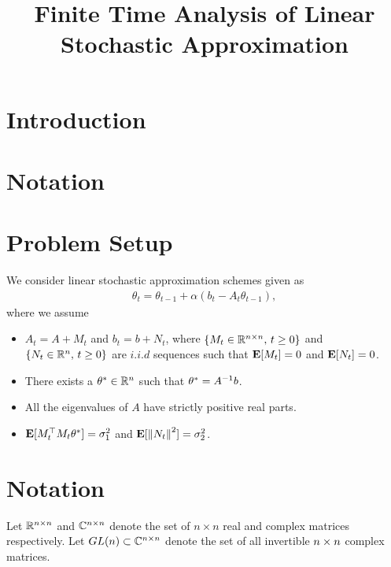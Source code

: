 \documentclass{article}
\title{Finite Time Analysis of Linear Stochastic Approximation}
\author{
}
\begin{document}

\maketitle
\begin{abstract}

\end{abstract}

\section{Introduction}
\section{Notation}

\section{Problem Setup}
We consider linear stochastic approximation schemes given as
\begin{align}
\theta_t=\theta_{t-1}+\alpha(b_t-A_t\theta_{t-1}),
\end{align}
where we assume
\begin{assumption}\label{ass:lsa}
\begin{itemize}[leftmargin=*, before = \leavevmode\vspace{-\baselineskip}]
\item $A_t=A+M_t$ and $b_t=b+N_t$, where $\{M_t \in \mathbb{R}^{n\times n},\,t\geq 0\}$ and $\{N_t\in\mathbb{R}^n,\,t\geq 0\}$ are $i.i.d$ sequences such that $\mathbf{E}[M_t]=0$ and $\mathbf{E}[N_t]=0$.
\item There exists a $\theta^*\in \mathbb{R}^n$ such that $\theta^*=A^{-1}b$.
\item All the eigenvalues of $A$ have strictly positive real parts.
\item $\mathbf{E}[M_t^\top M_t\theta^*]=\sigma_1^2$ and $\mathbf{E}[\left\| N_t\right\|^2]=\sigma_2^2$.
\end{itemize}
\end{assumption}

\begin{example}
\end{example}

\begin{example}[TD(0)]
\end{example}


\section{Notation}
Let $\mathbb{R}^{n\times n}$ and $\mathbb{C}^{n\times n}$ denote the set of $n\times n$ real and complex matrices respectively. Let $GL(n)\subset\mathbb{C}^{n\times n}$ denote the set of all invertible $n\times n$ complex matrices.
\end{document}
